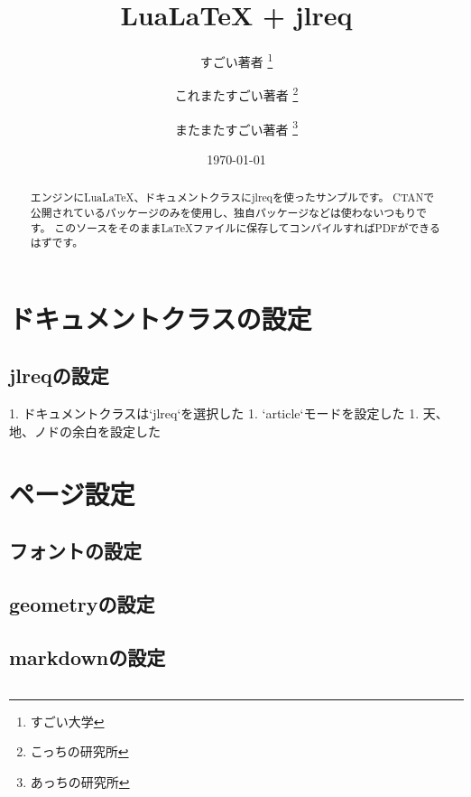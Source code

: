 \documentclass[
    article,
    head_space=25truemm,
    foot_space=10truemm,
    gutter=15truemm]{jlreq}
\title{LuaLaTeX + jlreq}
\author{
    すごい著者 \thanks{すごい大学} \\ \and
    これまたすごい著者 \thanks{こっちの研究所} \\ \and
    またまたすごい著者 \thanks{あっちの研究所}
}
\date{\today}
\begin{document}
\maketitle

\begin{abstract}
エンジンにLuaLaTeX、ドキュメントクラスにjlreqを使ったサンプルです。
CTANで公開されているパッケージのみを使用し、独自パッケージなどは使わないつもりです。
このソースをそのままLaTeXファイルに保存してコンパイルすればPDFができるはずです。
\end{abstract}

\tableofcontents

\section{ドキュメントクラスの設定}

\subsection{jlreqの設定}


\begin{markdown}
1. ドキュメントクラスは`jlreq`を選択した
1. `article`モードを設定した
1. 天、地、ノドの余白を設定した
\end{markdown}


\section{ページ設定}

\subsection{フォントの設定}

\subsection{geometryの設定}

\subsection{markdownの設定}

\inputminted{latex}{preamble/markdown.tex}
\end{document}
